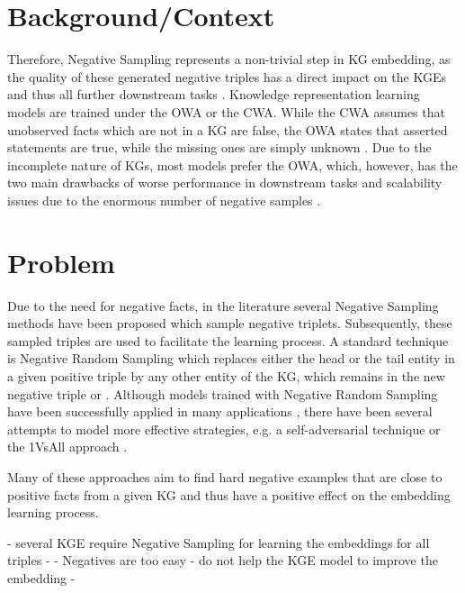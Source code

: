 \section{Background/Context}

Therefore, Negative Sampling represents a non-trivial step in \ac{KG} embedding, as the quality of these generated negative triples has a direct impact on the \acp{KGE} and thus all further downstream tasks \cite{qiannegative}.
Knowledge representation learning models are trained under the \ac{OWA} or the \ac{CWA}.
While the \ac{CWA} assumes that unobserved facts which are not in a \ac{KG} are false, the \ac{OWA}  states that asserted statements are true, while the missing ones are simply unknown \cite{arnaout2020enriching, qiannegative}.
Due to the incomplete nature of \acp{KG}, most models prefer the \ac{OWA}, which, however, has the two main drawbacks of worse performance in downstream tasks and scalability issues due to the enormous number of negative samples \cite{qiannegative}.




\section{Problem}

Due to the need for negative facts, in the literature several Negative Sampling methods have been proposed which sample negative triplets.
Subsequently, these sampled triples are used to facilitate the learning process. 
A standard technique is Negative Random Sampling which replaces either the head or the tail entity in a given positive triple   by any other entity of the \ac{KG}, which remains in the new negative triple  or . 
Although models trained with Negative Random Sampling have been successfully applied in many applications \cite{TransE}, there have been several attempts to model more effective strategies, e.g. 
a self-adversarial technique \cite{RotatE} or the 1VsAll approach \cite{ConvE}.

Many of these approaches aim to find hard negative examples that are close to positive facts from a given \ac{KG} and thus have a positive effect on the embedding learning process. 


- several KGE require Negative Sampling for learning the embeddings for all triples
- 
- Negatives are too easy
- do not help the \ac{KGE} model to improve the embedding
- 




